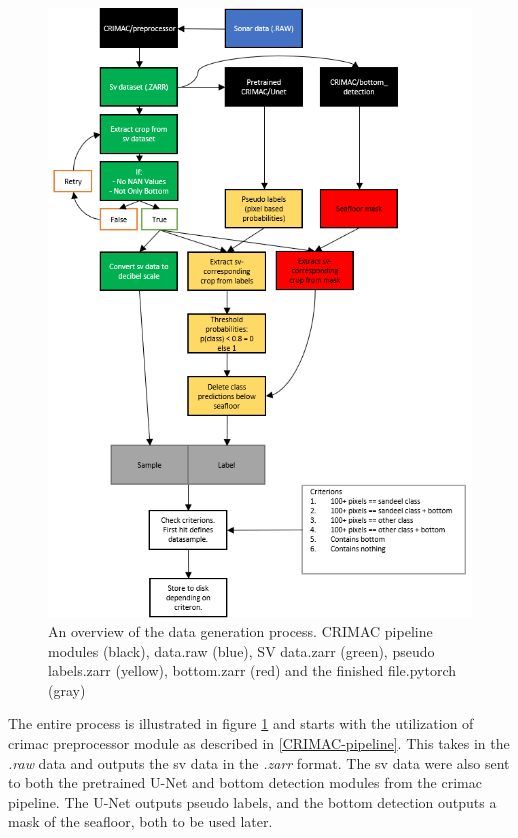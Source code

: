         \begin{figure}[H]
            \centering
            \includegraphics[scale=0.75]{figures/flow_data_gen.png}
            \caption[Data generation process]{An overview of the data generation process. CRIMAC pipeline modules (black), data.raw (blue), SV data.zarr (green), pseudo labels.zarr (yellow), bottom.zarr (red) and the finished file.pytorch (gray)}
          	\medskip 
            \label{data_generation_flowchart_fig}
        \end{figure}
        
        The entire process is illustrated in figure \ref{data_generation_flowchart_fig} and starts with the utilization of \gls{crimac} preprocessor module as described in \ref{CRIMAC-pipeline}. This takes in the \textit{.raw} data and outputs the \gls{sv} data in the \textit{.zarr} format. The \gls{sv} data were also sent to both the pretrained U-Net and bottom detection modules from the \gls{crimac} pipeline. The U-Net outputs pseudo labels, and the bottom detection outputs a mask of the seafloor, both to be used later.
        
